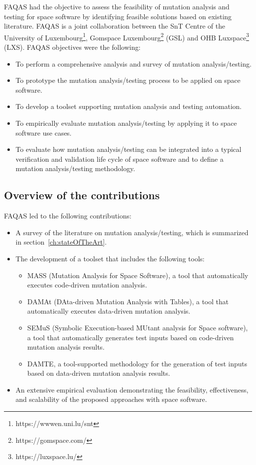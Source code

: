 FAQAS had the objective to assess the feasibility of mutation analysis and testing for space software by identifying feasible solutions based on existing literature. 
FAQAS is a joint collaboration between the SnT Centre of the University of Luxembourg\footnote{https://wwwen.uni.lu/snt}, Gomspace Luxembourg\footnote{https://gomspace.com/} (GSL) and OHB Luxspace\footnote{https://luxspace.lu/} (LXS).
FAQAS objectives were the following:
\begin{itemize}
\item To perform a comprehensive analysis and survey of mutation analysis/testing.
\item To prototype the mutation analysis/testing process to be applied on space software.
\item To develop a toolset supporting mutation analysis and testing automation.
\item To empirically evaluate mutation analysis/testing by applying it to space software use cases.
\item To evaluate how mutation analysis/testing can be integrated into a typical verification and validation life cycle of space software and to define a mutation analysis/testing methodology.
\end{itemize}


\subsection*{Overview of the contributions}

FAQAS led to the following contributions:
\begin{itemize}
\item A survey of the literature on mutation analysis/testing, which is summarized in section~\ref{ch:stateOfTheArt}.
\item The development of a toolset that includes the following tools:
\begin{itemize}
\item MASS (Mutation Analysis for Space Software), a tool that automatically executes code-driven mutation analysis. 
\item DAMAt (DAta-driven Mutation Analysis with Tables), a tool that automatically executes data-driven mutation analysis. 
\item SEMuS (Symbolic Execution-based MUtant analysis for Space software), a tool that automatically generates test inputs based on code-driven mutation analysis results.
\item DAMTE, a tool-supported methodology for the generation of test inputs based on data-driven mutation analysis results.
\end{itemize}
\item An extensive empirical evaluation demonstrating the feasibility, effectiveness, and scalability of the proposed approaches with space software.
\end{itemize}

